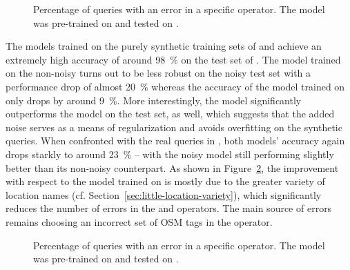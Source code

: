 \begin{figure}[h]
  \centering
  \resizebox{\textwidth}{!}{}
  \caption[Errors when pre-trained on \nlmtwoone{}]{Percentage of queries with an
    error in a specific operator. The model was pre-trained on \nlmapstwoone{}
    and tested on \nlmapsfour{}.}
  \label{fig:v21-errors}
\end{figure}

The models trained on the purely synthetic training sets of \nlmthreea{} and
\nlmthreeb{} achieve an extremely high accuracy of around \SI{98}{\%} on the
test set of \nlmthreea{}. The model trained on the non-noisy \nlmthreea{} turns
out to be less robust on the noisy \nlmthreeb{} test set with a performance drop
of almost \SI{20}{\%} whereas the accuracy of the model trained on \nlmthreeb{}
only drops by around \SI{9}{\%}. More interestingly, the \nlmthreeb{} model
significantly outperforms the \nlmthreea{} model on the \nlmtwoone{} test set,
as well, which suggests that the added noise serves as a means of regularization
and avoids overfitting on the synthetic queries. When confronted with the real
queries in \nlmapsfour{}, both models’ accuracy again drops starkly to around
\SI{23}{\%} – with the noisy model still performing slightly better than its
non-noisy counterpart. As shown in Figure~\ref{fig:v3b-errors}, the improvement
with respect to the model trained on \nlmtwoone{} is mostly due to the greater
variety of location names (cf. Section~\ref{sec:little-location-variety}), which
significantly reduces the number of errors in the  and
 operators. The main source of errors remains choosing an
incorrect set of OSM tags in the  operator.

\begin{figure}[h]
  \centering
  \resizebox{\textwidth}{!}{}
  \caption[Errors when pre-trained on \nlmthreeb{}]{Percentage of queries with an
    error in a specific operator. The model was pre-trained on \nlmapsthreeb{}
    and tested on \nlmapsfour{}.}
  \label{fig:v3b-errors}
\end{figure}

